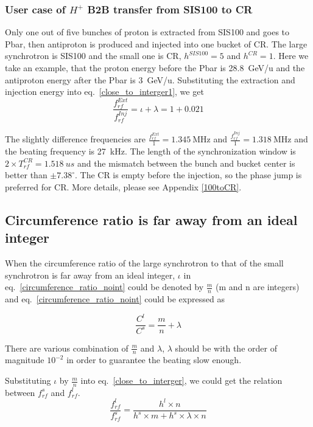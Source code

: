 \subsubsection{User case of $H^{+}$ B2B transfer from SIS100 to CR} 
Only one out of five bunches of proton is extracted from SIS100 and goes to Pbar, then antiproton is produced and injected into one bucket of CR. The large synchrotron is SIS100 and the small one is CR, $h^{SIS100}=5$ and $h^{CR}=1$. Here we take an example, that the proton energy before the Pbar is \SI{28.8}{GeV/\atomicmassunit} and the antiproton energy after the Pbar is \SI{3}{GeV/\atomicmassunit}. Substituting the extraction and injection energy into eq.~\ref{close_to_interger1}, we get
\begin{equation} 
\frac{f_{rf}^{Ext}}{f_{rf}^{Inj}}=\iota+ \lambda=1+0.021
\end{equation}

The slightly difference frequencies are $\frac{f_{rf}^{Ext}}{1}=\SI{1.345}{\MHz}$ and $\frac{f_{rf}^{Inj}}{1}=\SI{1.318}{\MHz}$ and the beating frequency is \SI{27}{\kHz}. The length of the synchronization window is $2\times T_{rf}^{CR}= \SI{1.518}{us}$ and the mismatch between the bunch and bucket center is better than $\pm7.38^\circ$. The CR is empty before the injection, so the phase jump is preferred for CR. More details, please see Appendix \ref{100toCR}.

\subsection{Circumference ratio is far away from an ideal integer} 
When the circumference ratio of the large synchrotron to that of the small synchrotron is far away from an ideal integer, $\iota$ in eq.~\ref{circumference_ratio_noint} could be denoted by $\frac{m}{n}$ (m and n are integers) and eq.~\ref{circumference_ratio_noint} could be expressed as

\begin{equation}
\frac{C^l}{C^s}=\frac{m}{n}+ \lambda \label{circumference_ratio_noint1}
\end{equation}

There are various combination of $\frac{m}{n}$ and $\lambda$, $\lambda$ should be with the order of magnitude $10^{-2}$ in order to guarantee the beating slow enough.


Substituting $\iota$ by $\frac{m}{n}$ into eq.~\ref{close_to_interger}, we could get the relation between $f_{rf}^{s}$ and $f_{rf}^{l}$.
\begin{equation} 
\frac{f_{rf}^{l}}{f_{rf}^{s}}=\frac{h^l\times n}{h^s \times m+ h^s \times\lambda\times n}\label{close_to_interger1}
\end{equation}

